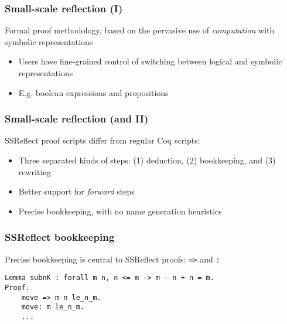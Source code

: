 \begin{frame}
    \frametitle{Small-scale reflection (I)}
    Formal proof methodology, based on the pervasive use of
\emph{computation} with symbolic representations
    \begin{itemize}
    \item Users have fine-grained control of switching between logical and symbolic representations
    \item E.g. boolean expressions and propositions
    \end{itemize}
\end{frame}

\begin{frame}
    \frametitle{Small-scale reflection (and II)}
    SSReflect proof scripts differ from regular Coq scripts: 
    \begin{itemize}
    \item Three separated kinds of steps: (1) deduction, (2) bookkeeping, and (3) rewriting
    \item Better support for \emph{forward} steps
    \item Precise bookkeeping, with no name generation heuristics
    \end{itemize}
\end{frame}

\begin{frame}[fragile]
    \frametitle{SSReflect bookkeeping}
    Precise bookkeeping is central to SSReflect proofs: \verb|=>| and \verb|:|
    \vspace{1cm}
    \begin{verbatim}
Lemma subnK : forall m n, n <= m -> m - n + n = m.
Proof.
    move => m n le_n_m.
    move: m le_n_m.
    ...
    \end{verbatim}
\end{frame}

